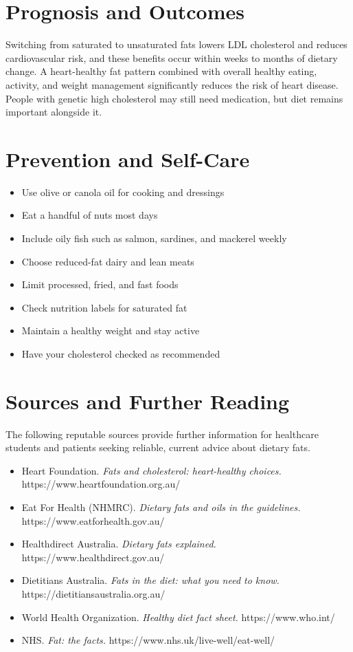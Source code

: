 \section*{Prognosis and Outcomes}
Switching from saturated to unsaturated fats lowers LDL cholesterol and reduces cardiovascular risk, and these benefits occur within weeks to months of dietary change. A heart-healthy fat pattern combined with overall healthy eating, activity, and weight management significantly reduces the risk of heart disease. People with genetic high cholesterol may still need medication, but diet remains important alongside it.

\section*{Prevention and Self-Care}
\begin{itemize}
    \item Use olive or canola oil for cooking and dressings
    \item Eat a handful of nuts most days
    \item Include oily fish such as salmon, sardines, and mackerel weekly
    \item Choose reduced-fat dairy and lean meats
    \item Limit processed, fried, and fast foods
    \item Check nutrition labels for saturated fat
    \item Maintain a healthy weight and stay active
    \item Have your cholesterol checked as recommended
\end{itemize}

\section*{Sources and Further Reading}
The following reputable sources provide further information for healthcare students and patients seeking reliable, current advice about dietary fats.

\begin{itemize}
    \item Heart Foundation. \textit{Fats and cholesterol: heart-healthy choices.} https://www.heartfoundation.org.au/
    \item Eat For Health (NHMRC). \textit{Dietary fats and oils in the guidelines.} https://www.eatforhealth.gov.au/
    \item Healthdirect Australia. \textit{Dietary fats explained.} https://www.healthdirect.gov.au/
    \item Dietitians Australia. \textit{Fats in the diet: what you need to know.} https://dietitiansaustralia.org.au/
    \item World Health Organization. \textit{Healthy diet fact sheet.} https://www.who.int/
    \item NHS. \textit{Fat: the facts.} https://www.nhs.uk/live-well/eat-well/
\end{itemize}
